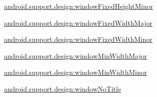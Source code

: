 {\ttfamily \hyperlink{classandroid_1_1support_1_1design_1_1R_1_1styleable_a772ad7624fd50e19bc24adae7d61f335}{android.\+support.\+design\+:window\+Fixed\+Height\+Minor}}

{\ttfamily \hyperlink{classandroid_1_1support_1_1design_1_1R_1_1styleable_ab12b360d277ad1c88a3ee93ff645a047}{android.\+support.\+design\+:window\+Fixed\+Width\+Major}}

{\ttfamily \hyperlink{classandroid_1_1support_1_1design_1_1R_1_1styleable_ab0a6460ce03febb5815a97617555e4ac}{android.\+support.\+design\+:window\+Fixed\+Width\+Minor}}

{\ttfamily \hyperlink{classandroid_1_1support_1_1design_1_1R_1_1styleable_a15a4daeba04d2f8277a443992fa1d153}{android.\+support.\+design\+:window\+Min\+Width\+Major}}

{\ttfamily \hyperlink{classandroid_1_1support_1_1design_1_1R_1_1styleable_a021b9cf9e84f6d782b685e0d9a05866a}{android.\+support.\+design\+:window\+Min\+Width\+Minor}}

{\ttfamily \hyperlink{classandroid_1_1support_1_1design_1_1R_1_1styleable_a81be05150eed15a8c4c447e2e4871635}{android.\+support.\+design\+:window\+No\+Title}}

